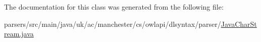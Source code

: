 The documentation for this class was generated from the following file\-:\begin{DoxyCompactItemize}
\item 
parsers/src/main/java/uk/ac/manchester/cs/owlapi/dlsyntax/parser/\hyperlink{uk_2ac_2manchester_2cs_2owlapi_2dlsyntax_2parser_2_java_char_stream_8java}{Java\-Char\-Stream.\-java}\end{DoxyCompactItemize}
